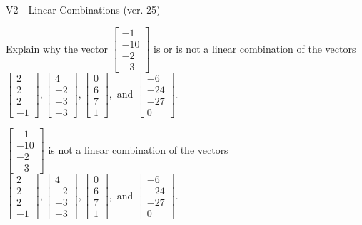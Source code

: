 \begin{exercise}
  \begin{exerciseTitle}V2 - Linear Combinations (ver. 25)\end{exerciseTitle}
  \begin{exerciseStatement}
    Explain why the vector \(\left[\begin{array}{c}
-1 \\
-10 \\
-2 \\
-3
\end{array}\right]\)  is or is not a linear 
	combination of the vectors \(\left[\begin{array}{c}
2 \\
2 \\
2 \\
-1
\end{array}\right] , \left[\begin{array}{c}
4 \\
-2 \\
-3 \\
-3
\end{array}\right] , \left[\begin{array}{c}
0 \\
6 \\
7 \\
1
\end{array}\right] , \text{ and } \left[\begin{array}{c}
-6 \\
-24 \\
-27 \\
0
\end{array}\right]\).
	


  \end{exerciseStatement}
  \begin{exerciseAnswer}
   \(\left[\begin{array}{c}
-1 \\
-10 \\
-2 \\
-3
\end{array}\right]\) 
  	 is not  
	a linear combination of the vectors \(\left[\begin{array}{c}
2 \\
2 \\
2 \\
-1
\end{array}\right] , \left[\begin{array}{c}
4 \\
-2 \\
-3 \\
-3
\end{array}\right] , \left[\begin{array}{c}
0 \\
6 \\
7 \\
1
\end{array}\right] , \text{ and } \left[\begin{array}{c}
-6 \\
-24 \\
-27 \\
0
\end{array}\right]\).


\end{exerciseAnswer}
\end{exercise}
